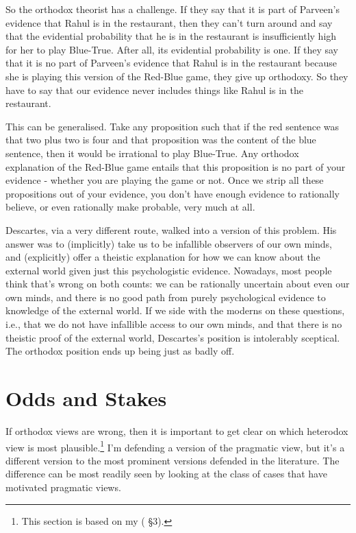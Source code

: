 \documentclass[
  10pt,
  letterpaper,
  twoside]{scrbook}
\begin{document}
So the orthodox theorist has a challenge. If they say that it is part of
Parveen's evidence that Rahul is in the restaurant, then they can't turn
around and say that the evidential probability that he is in the
restaurant is insufficiently high for her to play Blue-True. After all,
its evidential probability is one. If they say that it is no part of
Parveen's evidence that Rahul is in the restaurant because she is
playing this version of the Red-Blue game, they give up orthodoxy. So
they have to say that our evidence never includes things like Rahul is
in the restaurant.

This can be generalised. Take any proposition such that if the red
sentence was that two plus two is four and that proposition was the
content of the blue sentence, then it would be irrational to play
Blue-True. Any orthodox explanation of the Red-Blue game entails that
this proposition is no part of your evidence - whether you are playing
the game or not. Once we strip all these propositions out of your
evidence, you don't have enough evidence to rationally believe, or even
rationally make probable, very much at all.

Descartes, via a very different route, walked into a version of this
problem. His answer was to (implicitly) take us to be infallible
observers of our own minds, and (explicitly) offer a theistic
explanation for how we can know about the external world given just this
psychologistic evidence. Nowadays, most people think that's wrong on
both counts: we can be rationally uncertain about even our own minds,
and there is no good path from purely psychological evidence to
knowledge of the external world. If we side with the moderns on these
questions, i.e., that we do not have infallible access to our own minds,
and that there is no theistic proof of the external world, Descartes's
position is intolerably sceptical. The orthodox position ends up being
just as badly off.

\section{Odds and Stakes}\label{sec-oddsandstakes}

If orthodox views are wrong, then it is important to get clear on which
heterodox view is most plausible.\footnote{This section is based on my
  ( §3).} I'm defending a version of
the pragmatic view, but it's a different version to the most prominent
versions defended in the literature. The difference can be most readily
seen by looking at the class of cases that have motivated pragmatic
views.
\end{document}
